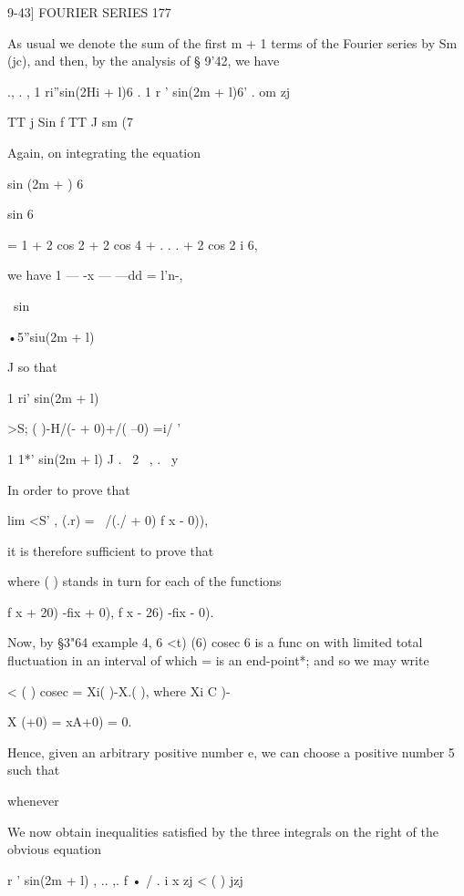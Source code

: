 9-43] FOURIER SERIES 177 

As usual we denote the sum of the first m + 1 terms of the Fourier series 
by Sm  (jc), and then, by the analysis of § 9'42, we have 

., . , 1 ri''sin(2Hi + l)6  . 1 r ' sin(2m + l)6' . om  zj 

TT j Sin f TT J sm (7 

Again, on integrating the equation 

sin (2m + ) 6 



sin 6 



= 1 + 2 cos 2  + 2 cos 4  + . . . + 2 cos 2 i 6, 



we have 1     — -x — —dd = l'n-, 

\ sin  



•5''siu(2m + l)  

J 
so that 

1 ri' sin(2m + l)  



>S; ( )-H/(-  + 0)+/( --0) =i/ '    



  1 1*'  sin(2m + l)  J . \  2  \   , . \   y  



In order to prove that 

lim <S' , (.r) = \  /(./  + 0)  f x - 0)), 

it is therefore sufficient to prove that 

where   ( ) stands in turn for each of the functions 

f x + 20) -fix + 0), f x - 26) -fix - 0). 

Now, by §3"64 example 4, 6 <t) (6) cosec 6 is a func on with limited total 
fluctuation in an interval of which   = is an end-point*; and so we may 
write 

  < ( ) cosec   = Xi( )-X.( ), 
where Xi C )- %

X (+0) = xA+0) = 0. 

Hence, given an arbitrary positive number e, we can choose a positive 
number 5 such that 

whenever %

We now obtain inequalities satisfied by the three integrals on the right 
of the obvious equation 

r ' sin(2m + l)  , ..  ,. f  • /  . i x zj < ( ) jzj 

